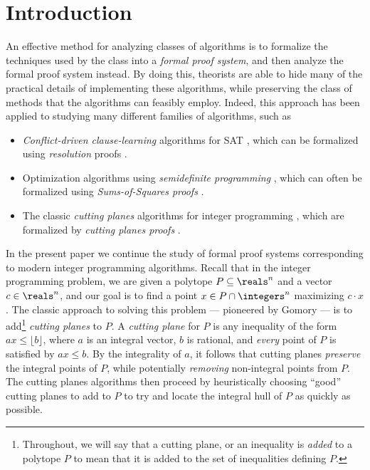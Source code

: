 
%
%
%

\section{Introduction}
\label{sec:intro}
%

An effective method for analyzing classes of algorithms is to formalize the techniques used by the class into a \emph{formal proof system}, and then analyze the formal proof system instead. 
By doing this, theorists are able to hide many of the practical details of implementing these algorithms, while preserving the class of methods that the algorithms can feasibly employ.
Indeed, this approach has been applied to %
studying  %
many different families of algorithms, such as 
\begin{itemize}
\item \emph{Conflict-driven clause-learning} algorithms for SAT
\cite{BayardoS97,MarquesS99,MoskewiczMZZM01}, 
which can be formalized using \emph{resolution} proofs \cite{DavisP60}.
	\item Optimization algorithms using \emph{semidefinite programming} \cite{Goemans1994,parrilo2000}, which can often be formalized using \emph{Sums-of-Squares proofs} \cite{dima-sos,BarakBHKSZ12}.
	\item The classic \emph{cutting planes} algorithms for integer programming \cite{gomory1963algorithm,Chvatal73a}, which are formalized by \emph{cutting planes proofs} \cite{Chvatal73a, Chvatal84, CookCT87}.
\end{itemize}

In the present %
paper   %
we continue the study of formal proof systems corresponding to modern integer programming algorithms.
Recall that in the integer programming problem, we are given a polytope $P \subseteq \reals^n$ and a vector $c \in \reals^n$, and our goal is to find a point $x \in P \cap \integers^n$ maximizing $c \cdot x$.
The classic approach to solving this problem --- pioneered by Gomory \cite{gomory1963algorithm} --- is to add\footnote{Throughout, we will say that a cutting plane, or an inequality is \emph{added} to a polytope $P$ to mean that it is added to the set of inequalities defining $P$.} \emph{cutting planes} to  $P$.
A \emph{cutting plane} for $P$ is any inequality of the form $ax \leq \lfloor b \rfloor$, where $a$ is an integral vector, $b$ is rational, and \emph{every} point of $P$ is satisfied by $ax \leq b$.
By the integrality of $a$, it follows that cutting planes \emph{preserve} the integral points of $P$, while potentially \emph{removing} non-integral points from $P$.
The cutting planes algorithms then proceed by heuristically choosing ``good'' cutting planes to add to $P$ to try and locate the integral hull of $P$ as quickly as possible.

